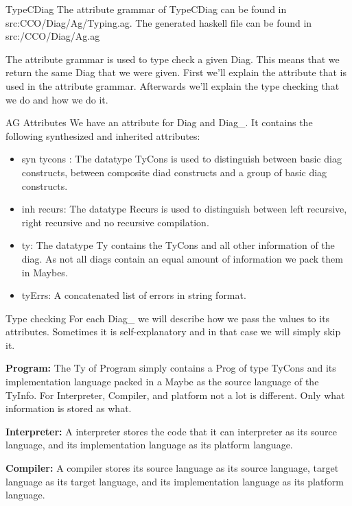 \documentclass{article}
\begin{document}
\begin{subsection}{TypeCDiag}
The attribute grammar of TypeCDiag can be found in src:CCO/Diag/Ag/Typing.ag. The generated haskell file can be found in src:/CCO/Diag/Ag.ag

\hfill \break

The attribute grammar is used to type check a given Diag. This means that we return the same Diag that we were given. First we'll explain the attribute that is used in the attribute grammar. Afterwards we'll explain the type checking that we do and how we do it.
\begin{subsubsection}{AG Attributes}
We have an attribute for Diag and Diag\_. It contains the following synthesized and inherited attributes:
	\begin{itemize}
	\item syn tycons : The datatype TyCons is used to distinguish between basic diag constructs, between composite diad constructs and a group of basic diag constructs.
	\item inh recurs: The datatype Recurs is used to distinguish between left recursive, right recursive and no recursive compilation.
	\item ty: The datatype Ty contains the TyCons and all other information of the diag. As not all diags contain an equal amount of information we pack them in Maybes.
	\item tyErrs: A concatenated list of errors in string format.
	\end{itemize}
\end{subsubsection}
\begin{subsubsection}{Type checking}
For each Diag\_ we will describe how we pass the values to its attributes. Sometimes it is self-explanatory and in that case we will simply skip it.

\hfill \break

\textbf{Program:} The Ty of Program simply contains a Prog of type TyCons and its implementation language packed in a Maybe as the source language of the TyInfo. For Interpreter, Compiler, and platform not a lot is different. Only what information is stored as what.

\hfill \break

\textbf{Interpreter:} A interpreter stores the code that it can interpreter as its source language, and its implementation language as its platform language.

\hfill \break

\textbf{Compiler:} A compiler stores its source language as its source language, target language as its target language, and its implementation language as its platform language.


\end{subsubsection}
\end{subsection}
\end{document}
